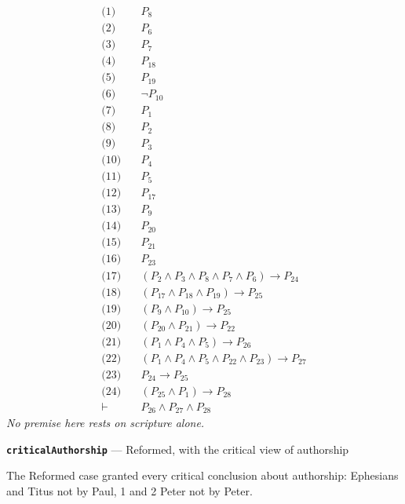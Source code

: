 \documentclass[11pt]{article}
\begin{document}
\begin{align*}
  \text{(1)} \quad & P_{8} \\
  \text{(2)} \quad & P_{6} \\
  \text{(3)} \quad & P_{7} \\
  \text{(4)} \quad & P_{18} \\
  \text{(5)} \quad & P_{19} \\
  \text{(6)} \quad & \lnot P_{10} \\
  \text{(7)} \quad & P_{1} \\
  \text{(8)} \quad & P_{2} \\
  \text{(9)} \quad & P_{3} \\
  \text{(10)} \quad & P_{4} \\
  \text{(11)} \quad & P_{5} \\
  \text{(12)} \quad & P_{17} \\
  \text{(13)} \quad & P_{9} \\
  \text{(14)} \quad & P_{20} \\
  \text{(15)} \quad & P_{21} \\
  \text{(16)} \quad & P_{23} \\
  \text{(17)} \quad & (P_{2} \land P_{3} \land P_{8} \land P_{7} \land P_{6}) \rightarrow P_{24} \\
  \text{(18)} \quad & (P_{17} \land P_{18} \land P_{19}) \rightarrow P_{25} \\
  \text{(19)} \quad & (P_{9} \land P_{10}) \rightarrow P_{25} \\
  \text{(20)} \quad & (P_{20} \land P_{21}) \rightarrow P_{22} \\
  \text{(21)} \quad & (P_{1} \land P_{4} \land P_{5}) \rightarrow P_{26} \\
  \text{(22)} \quad & (P_{1} \land P_{4} \land P_{5} \land P_{22} \land P_{23}) \rightarrow P_{27} \\
  \text{(23)} \quad & P_{24} \rightarrow P_{25} \\
  \text{(24)} \quad & (P_{25} \land P_{1}) \rightarrow P_{28} \\
  \vdash \quad & P_{26} \land P_{27} \land P_{28}
\end{align*}
\emph{No premise here rests on scripture alone.}
\par\medskip\noindent\textbf{\texttt{critical\allowbreak{}Authorship}} --- Reformed, with the critical view of authorship\par\nobreak\noindent
The Reformed case granted every critical conclusion about authorship: Ephesians and Titus not by Paul, 1 and 2 Peter not by Peter.
\end{document}
